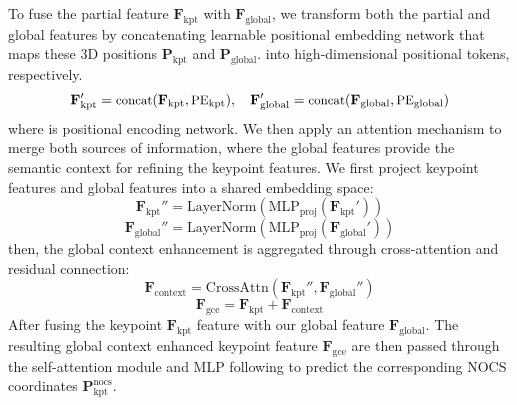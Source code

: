 To fuse the partial feature $\mathbf{F}_{\text{kpt}}$ with $\mathbf{F}_{\text{global}}$, we transform both the partial and global features by concatenating learnable positional embedding network that maps these 3D  positions \( \mathbf{P}_{\text{kpt}}\) and \( \mathbf{P}_{\text{global}}\). into high-dimensional positional tokens, respectively. 
\begin{equation}
\small
\mathbf{F}_{\text{kpt}}' = \text{concat}(\mathbf{F}_{\text{kpt}}, \text{PE}_{\text{kpt}}), \quad \mathbf{F}_{\text{global}}' = \text{concat}(\mathbf{F}_{\text{global}}, \text{PE}_{\text{global}})
\end{equation}
where  is positional encoding network.
We then apply an attention mechanism to merge both sources of information, where the global features provide the semantic context for refining the keypoint features.
We first project keypoint features and global features into a shared embedding space:
\begin{equation}
    \mathbf{F}_{\text{kpt}}'' = \text{LayerNorm}(\text{MLP}_{\text{proj}}(\mathbf{F}_{\text{kpt}}'))
\end{equation}
\begin{equation}
    \mathbf{F}_{\text{global}}'' = \text{LayerNorm}(\text{MLP}_{\text{proj}}(\mathbf{F}_{\text{global}}'))
\end{equation}
then, the global context enhancement is aggregated through cross-attention and residual connection:
\begin{equation}
    \mathbf{F}_{\text{context}} = \text{CrossAttn}(\mathbf{F}_{\text{kpt}}'', \mathbf{F}_{\text{global}}'')
\end{equation}
\begin{equation}
    \mathbf{F}_{\text{gce}} = \mathbf{F}_{\text{kpt}} + \mathbf{F}_{\text{context}}
\end{equation}
After fusing the keypoint $\mathbf{F}_{\text{kpt}}$ feature with our global feature $\mathbf{F}_{\text{global}}$. The resulting global context enhanced keypoint feature $\mathbf{F}_{\text{gce}}$ are then passed through the self-attention module and MLP following \cite{lin2022category} to predict the corresponding NOCS coordinates $\mathbf{P}_{\text{kpt}}^{\text{nocs}}$.

